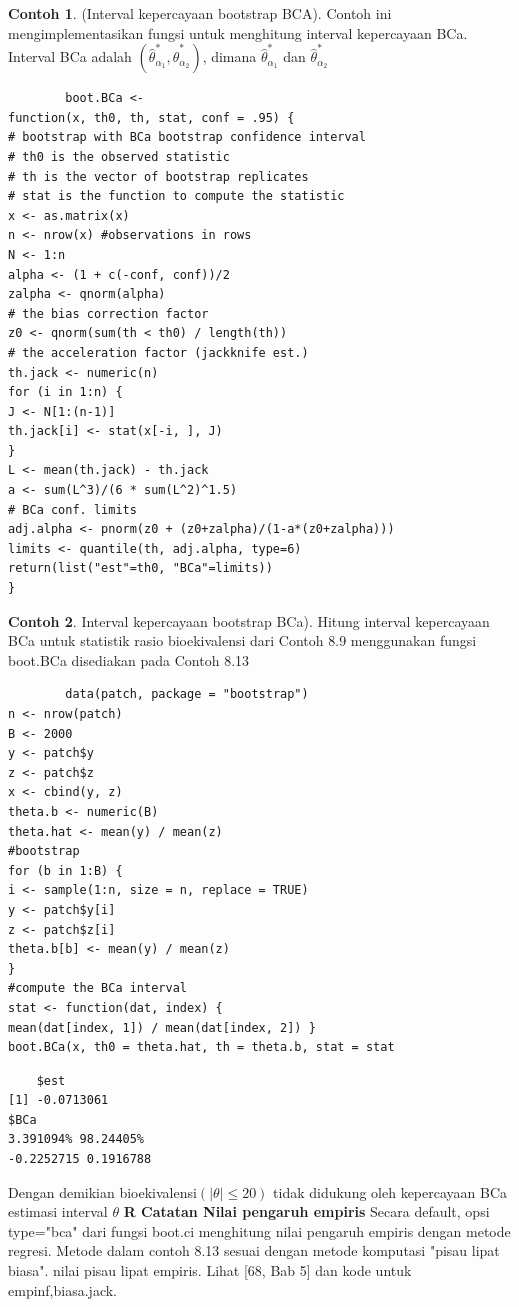 \documentclass[a4paper,12pt]{article}
\theoremstyle{definition}
\newtheorem{example}{Contoh}[section]
\begin{document}
\begin{example}
(Interval kepercayaan bootstrap BCA). Contoh ini mengimplementasikan fungsi untuk menghitung interval kepercayaan BCa. Interval BCa adalah $(\widehat{\theta }_{\alpha _{1}}^{*},\widehat{\theta }_{\alpha _{2}}^{*} )$, dimana $\widehat{\theta }_{\alpha _{1}}^{*}$ dan $\widehat{\theta }_{\alpha _{2}}^{*}$
    \begin{lstlisting}
        boot.BCa <-
function(x, th0, th, stat, conf = .95) {
# bootstrap with BCa bootstrap confidence interval
# th0 is the observed statistic
# th is the vector of bootstrap replicates
# stat is the function to compute the statistic
x <- as.matrix(x)
n <- nrow(x) #observations in rows
N <- 1:n
alpha <- (1 + c(-conf, conf))/2
zalpha <- qnorm(alpha)
# the bias correction factor
z0 <- qnorm(sum(th < th0) / length(th))
# the acceleration factor (jackknife est.)
th.jack <- numeric(n)
for (i in 1:n) {
J <- N[1:(n-1)]
th.jack[i] <- stat(x[-i, ], J)
}
L <- mean(th.jack) - th.jack
a <- sum(L^3)/(6 * sum(L^2)^1.5)
# BCa conf. limits
adj.alpha <- pnorm(z0 + (z0+zalpha)/(1-a*(z0+zalpha)))
limits <- quantile(th, adj.alpha, type=6)
return(list("est"=th0, "BCa"=limits))
}
    \end{lstlisting}
\end{example}
\begin{example}
Interval kepercayaan bootstrap BCa). Hitung interval kepercayaan BCa untuk statistik rasio bioekivalensi dari Contoh 8.9 menggunakan fungsi boot.BCa disediakan pada Contoh 8.13
    \begin{lstlisting}
        data(patch, package = "bootstrap")
n <- nrow(patch)
B <- 2000
y <- patch$y
z <- patch$z
x <- cbind(y, z)
theta.b <- numeric(B)
theta.hat <- mean(y) / mean(z)
#bootstrap
for (b in 1:B) {
i <- sample(1:n, size = n, replace = TRUE)
y <- patch$y[i]
z <- patch$z[i]
theta.b[b] <- mean(y) / mean(z)
}
#compute the BCa interval
stat <- function(dat, index) {
mean(dat[index, 1]) / mean(dat[index, 2]) }
boot.BCa(x, th0 = theta.hat, th = theta.b, stat = stat
    \end{lstlisting}
\begin{lstlisting}
    $est
[1] -0.0713061
$BCa
3.391094% 98.24405%
-0.2252715 0.1916788
\end{lstlisting}
Dengan demikian bioekivalensi$(|\theta |\leq 20)$ tidak didukung oleh kepercayaan BCa estimasi interval $\theta$
\textbf{R Catatan Nilai pengaruh empiris}
Secara default, opsi type="bca" dari fungsi boot.ci menghitung
nilai pengaruh empiris dengan metode regresi. Metode dalam contoh 8.13 sesuai dengan metode komputasi "pisau lipat biasa".
nilai pisau lipat empiris. Lihat [68, Bab 5] dan kode untuk empinf,biasa.jack.
\end{example}
\end{document}
